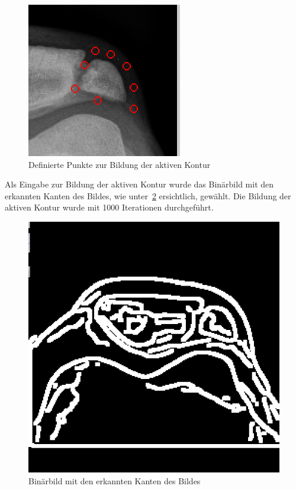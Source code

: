 \begin{figure}[h!]
    \centering
    \includegraphics[scale=0.5]{images/ownimpl_contour.png}
    \caption{Definierte Punkte zur Bildung der aktiven Kontur\protect\footnotemark[4]{}}
\label{fig:ownimpl_contour}
\end{figure}

Als Eingabe zur Bildung der aktiven Kontur wurde das Binärbild mit den erkannten Kanten des Bildes, wie unter~\ref{fig:ownimpl_edges} ersichtlich, gewählt. Die Bildung der aktiven Kontur wurde mit 1000 Iterationen durchgeführt.

\begin{figure}[H]
    \centering
    \includegraphics[scale=0.25]{images/ownimpl_edges.png}
    \caption{Binärbild mit den erkannten Kanten des Bildes\protect\footnotemark[6]{}}
\label{fig:ownimpl_edges}
\end{figure}

